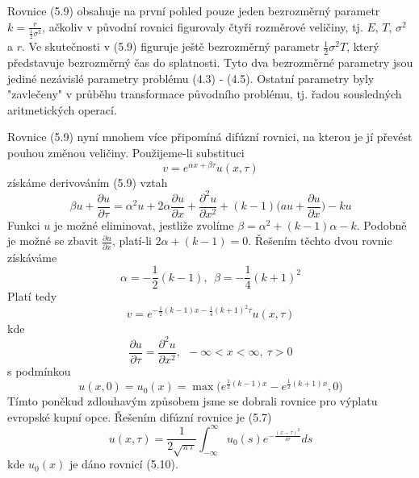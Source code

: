 \documentclass[a4paper]{book}
\begin{document}
Rovnice (5.9) obsahuje na první pohled pouze jeden bezrozměrný parametr $k = \frac{r}{\frac{1}{2}\sigma^2}$, ačkoliv v původní rovnici figurovaly čtyři rozměrové veličiny, tj. $E$, $T$, $\sigma^2$ a $r$. Ve skutečnosti v (5.9) figuruje ještě bezrozměrný parametr $\frac{1}{2}\sigma^2T$, který představuje bezrozměrný čas do splatnosti. Tyto dva bezrozměrné parametry jsou jediné nezávislé parametry problému (4.3) - (4.5). Ostatní parametry byly "zavlečeny" v průběhu transformace původního problému, tj. řadou sousledných aritmetických operací.

Rovnice (5.9) nyní mnohem více připomíná difúzní rovnici, na kterou je jí převést pouhou změnou veličiny. Použijeme-li substituci
\begin{equation*}
v = e^{\alpha x + \beta \tau}u(x, \tau)
\end{equation*}
získáme derivováním (5.9) vztah
\begin{equation*}
\beta u + \frac{\partial u}{\partial \tau} = \alpha^2 u + 2 \alpha \frac{\partial u}{\partial x} + \frac{\partial^2 u}{\partial x^2} + (k - 1)\bigg( au + \frac{\partial u}{\partial x} \bigg) - ku
\end{equation*}
Funkci $u$ je možné eliminovat, jestliže zvolíme $\beta = \alpha^2 + (k - 1)\alpha - k$. Podobně je možné se zbavit $\frac{\partial u}{\partial x}$, platí-li $2\alpha + (k - 1) = 0$. Řešením těchto dvou rovnic získáváme
\begin{equation*}
\alpha = -\frac{1}{2}(k - 1), ~~ \beta = -\frac{1}{4}(k + 1)^2
\end{equation*}
Platí tedy
\begin{equation*}
v = e^{-\frac{1}{2}(k - 1)x - \frac{1}{4}(k + 1)^2 \tau}u(x, \tau)
\end{equation*}
kde
\begin{equation*}
\frac{\partial u}{\partial \tau} = \frac{\partial^2 u}{\partial x^2},~~ -\infty < x < \infty,~ \tau > 0
\end{equation*}
s podmínkou
\begin{equation}
u(x, 0) = u_0(x) = \max \bigg( e^{\frac{1}{2}(k-1)x} - e^{\frac{1}{2}(k+1)x}, 0 \bigg)
\end{equation}
Tímto poněkud zdlouhavým způsobem jsme se dobrali rovnice pro výplatu evropské kupní opce. Řešením difúzní rovnice je (5.7)
\begin{equation}
u(x, \tau) = \frac{1}{2\sqrt{\pi \tau}} \int^{\infty}_{-\infty} u_0(s)e^{-\frac{(x-\tau)^2}{4 \tau}} ds
\end{equation}
kde $u_0(x)$ je dáno rovnicí (5.10).
\end{document}
